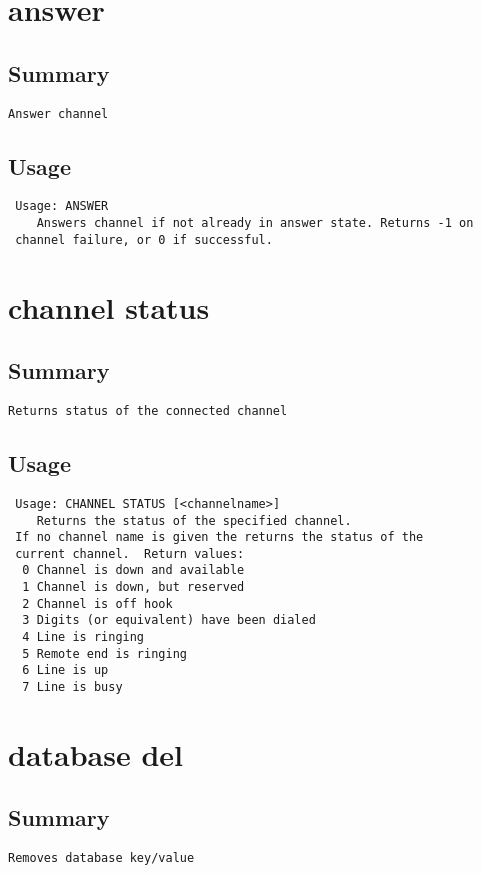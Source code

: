 \section{answer}
\subsection{Summary}
\begin{verbatim}
Answer channel
\end{verbatim}
\subsection{Usage}
\begin{verbatim}
 Usage: ANSWER
	Answers channel if not already in answer state. Returns -1 on
 channel failure, or 0 if successful.

\end{verbatim}


\section{channel status}
\subsection{Summary}
\begin{verbatim}
Returns status of the connected channel
\end{verbatim}
\subsection{Usage}
\begin{verbatim}
 Usage: CHANNEL STATUS [<channelname>]
	Returns the status of the specified channel.
 If no channel name is given the returns the status of the
 current channel.  Return values:
  0 Channel is down and available
  1 Channel is down, but reserved
  2 Channel is off hook
  3 Digits (or equivalent) have been dialed
  4 Line is ringing
  5 Remote end is ringing
  6 Line is up
  7 Line is busy

\end{verbatim}


\section{database del}
\subsection{Summary}
\begin{verbatim}
Removes database key/value
\end{verbatim}
